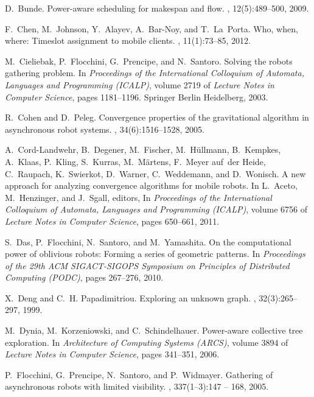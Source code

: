 \documentclass{article}
\begin{document}
\begin{thebibliography}{10}
D.~Bunde.
\newblock Power-aware scheduling for makespan and flow.
, 12(5):489--500, 2009.

F.~Chen, M.~Johnson, Y.~Alayev, A.~Bar-Noy, and T.~La~Porta.
\newblock Who, when, where: Timeslot assignment to mobile clients.
, 11(1):73--85, 2012.

M.~Cieliebak, P.~Flocchini, G.~Prencipe, and N.~Santoro.
\newblock Solving the robots gathering problem.
\newblock In {\em Proceedings of the International Colloquium of Automata, Languages and Programming (ICALP)},
  volume 2719 of {\em Lecture Notes in Computer Science}, pages 1181--1196.
  Springer Berlin Heidelberg, 2003.

R.~Cohen and D.~Peleg.
\newblock Convergence properties of the gravitational algorithm in asynchronous
  robot systems.
, 34(6):1516--1528, 2005.

A.~Cord-Landwehr, B.~Degener, M.~Fischer, M.~Hüllmann, B.~Kempkes, A.~Klaas,
  P.~Kling, S.~Kurras, M.~Märtens, F.~Meyer auf~der Heide, C.~Raupach,
  K.~Swierkot, D.~Warner, C.~Weddemann, and D.~Wonisch.
\newblock A new approach for analyzing convergence algorithms for mobile
  robots.
\newblock In L.~Aceto, M.~Henzinger, and J.~Sgall, editors, In {\em Proceedings of the International
  Colloquium of Automata, Languages and Programming (ICALP)}, volume 6756 of
  {\em Lecture Notes in Computer Science}, pages 650--661, 2011.

S.~Das, P.~Flocchini, N.~Santoro, and M.~Yamashita.
\newblock On the computational power of oblivious robots: Forming a series of
  geometric patterns.
\newblock In {\em Proceedings of the 29th ACM SIGACT-SIGOPS Symposium on
  Principles of Distributed Computing (PODC)}, pages 267--276, 2010.

X.~Deng and C.~H. Papadimitriou.
\newblock Exploring an unknown graph.
, 32(3):265--297, 1999.


M.~Dynia, M.~Korzeniowski, and C.~Schindelhauer.
\newblock Power-aware collective tree exploration.
\newblock In {\em Architecture of Computing Systems (ARCS)}, volume 3894 of {\em Lecture Notes in
  Computer Science}, pages 341--351, 2006.

P.~Flocchini, G.~Prencipe, N.~Santoro, and P.~Widmayer.
\newblock Gathering of asynchronous robots with limited visibility.
, 337(1–3):147 -- 168, 2005.


\end{thebibliography}
\end{document}
